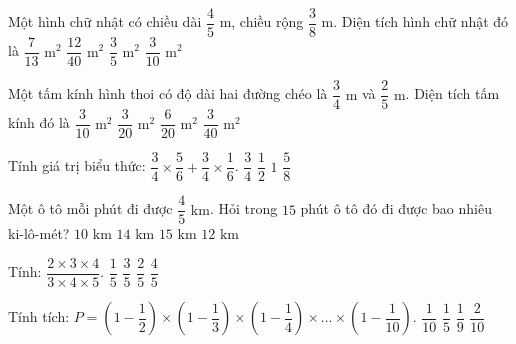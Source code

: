 \begin{ex} %
Một hình chữ nhật có chiều dài $\dfrac{4}{5}\text{ m}$, chiều rộng $\dfrac{3}{8}\text{ m}$. Diện tích hình chữ nhật đó là
\choice
{$\dfrac{7}{13}\text{ m}^2$}
{$\dfrac{12}{40}\text{ m}^2$}
{$\dfrac{3}{5}\text{ m}^2$}
{\True $\dfrac{3}{10}\text{ m}^2$}
\end{ex}

\begin{ex} %
Một tấm kính hình thoi có độ dài hai đường chéo là $\dfrac{3}{4}\text{ m}$ và $\dfrac{2}{5}\text{ m}$. Diện tích tấm kính đó là
\choice
{$\dfrac{3}{10}\text{ m}^2$}
{\True $\dfrac{3}{20}\text{ m}^2$}
{$\dfrac{6}{20}\text{ m}^2$}
{$\dfrac{3}{40}\text{ m}^2$}
\end{ex}

\begin{ex} %
Tính giá trị biểu thức: $\dfrac{3}{4} \times \dfrac{5}{6} + \dfrac{3}{4} \times \dfrac{1}{6}$.
\choice
{\True $\dfrac{3}{4}$}
{$\dfrac{1}{2}$}
{$1$}
{$\dfrac{5}{8}$}
\end{ex}

\begin{ex} %
Một ô tô mỗi phút đi được $\dfrac{4}{5}\text{ km}$. Hỏi trong $15$ phút ô tô đó đi được bao nhiêu ki-lô-mét?
\choice
{$10\text{ km}$}
{$14\text{ km}$}
{$15\text{ km}$}
{\True $12\text{ km}$}
\end{ex}

\begin{ex} %
Tính: $\dfrac{2 \times 3 \times 4}{3 \times 4 \times 5}$.
\choice
{$\dfrac{1}{5}$}
{$\dfrac{3}{5}$}
{\True $\dfrac{2}{5}$}
{$\dfrac{4}{5}$}
\end{ex}

\begin{ex} %
Tính tích: $P = \left(1 - \dfrac{1}{2}\right) \times \left(1 - \dfrac{1}{3}\right) \times \left(1 - \dfrac{1}{4}\right) \times \dots \times \left(1 - \dfrac{1}{10}\right)$.
\choice
{\True $\dfrac{1}{10}$}
{$\dfrac{1}{5}$}
{$\dfrac{1}{9}$}
{$\dfrac{2}{10}$}
\end{ex}

